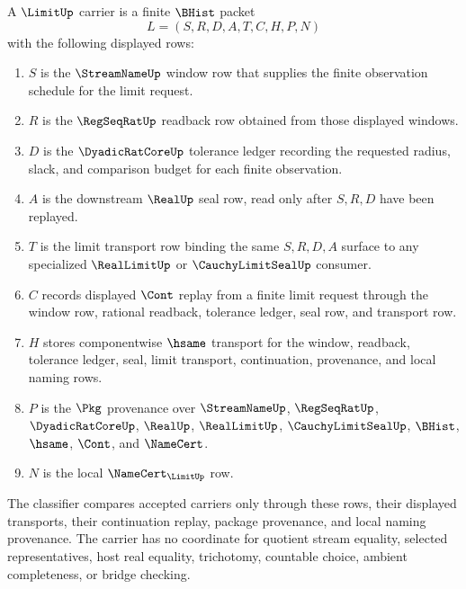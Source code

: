 \begin{definition}
\label{def:limit-carrier}
A $\LimitUp$ carrier is a finite $\BHist$ packet
$$
L=(S,R,D,A,T,C,H,P,N)
$$
with the following displayed rows:
\begin{enumerate}
\item $S$ is the $\StreamNameUp$ window row that supplies the finite observation schedule for the limit request.
\item $R$ is the $\RegSeqRatUp$ readback row obtained from those displayed windows.
\item $D$ is the $\DyadicRatCoreUp$ tolerance ledger recording the requested radius, slack, and comparison budget for each finite observation.
\item $A$ is the downstream $\RealUp$ seal row, read only after $S,R,D$ have been replayed.
\item $T$ is the limit transport row binding the same $S,R,D,A$ surface to any specialized $\RealLimitUp$ or $\CauchyLimitSealUp$ consumer.
\item $C$ records displayed $\Cont$ replay from a finite limit request through the window row, rational readback, tolerance ledger, seal row, and transport row.
\item $H$ stores componentwise $\hsame$ transport for the window, readback, tolerance ledger, seal, limit transport, continuation, provenance, and local naming rows.
\item $P$ is the $\Pkg$ provenance over $\StreamNameUp$, $\RegSeqRatUp$, $\DyadicRatCoreUp$, $\RealUp$, $\RealLimitUp$, $\CauchyLimitSealUp$, $\BHist$, $\hsame$, $\Cont$, and $\NameCert$.
\item $N$ is the local $\NameCert_{\LimitUp}$ row.
\end{enumerate}
The classifier compares accepted carriers only through these rows, their displayed transports, their continuation replay, package provenance, and local naming provenance. The carrier has no coordinate for quotient stream equality, selected representatives, host real equality, trichotomy, countable choice, ambient completeness, or bridge checking.
\end{definition}

